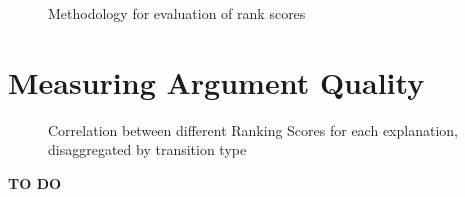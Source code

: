 \documentclass[notitlepage,12pt]{jedm}
\begin{document}
\begin{figure}
	\caption{Methodology for evaluation of rank scores}
	\label{fig:evaluate_rankings}
\end{figure}

\section{Measuring Argument Quality}\label{sec:measure}
\begin{figure}
	\scalebox{0.6}{}
	\caption{
		Correlation between different Ranking Scores for each explanation, 
		disaggregated by transition type  
	}
	\label{fig:acc_by_rank_score_type}
\end{figure}

\textbf{TO DO}


\end{document}
